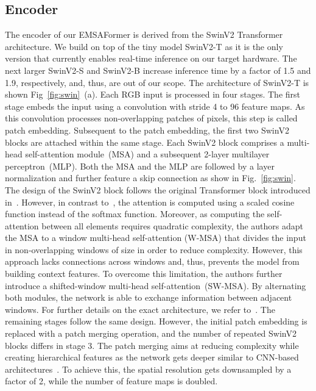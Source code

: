 \documentclass[conference]{IEEEtran}
\begin{document}
\subsection{Encoder}
\label{sec:main:encoder}
The encoder of our EMSAFormer is derived from the SwinV2 Transformer~\cite{swinv2-cvpr2022} architecture.
We build on top of the tiny model SwinV2-T as it is the only version that currently enables real-time inference on our target hardware. 
The next larger SwinV2-S and SwinV2-B increase inference time by a factor of 1.5 and 1.9, respectively, and, thus, are out of our scope.
The architecture of SwinV2-T is shown Fig~\ref{fig:swin}~(a).
Each RGB input is processed in four stages. 
The first stage embeds the input using a  convolution with stride 4 to 96 feature maps. 
As this convolution processes non-overlapping patches of  pixels, this step is called patch embedding.
Subsequent to the patch embedding, the first two SwinV2 blocks are attached within the same stage. 
Each SwinV2 block comprises a multi-head self-attention module~(MSA) and a subsequent 2-layer multilayer perceptron~(MLP). 
Both the MSA and the MLP are followed by a layer normalization and further feature a skip connection as show in Fig.~\ref{fig:swin}.
The design of the SwinV2 block follows the original Transformer block introduced in~\cite{Transformer-neurips2017}.
However, in contrast to~\cite{Transformer-neurips2017, swin-iccv2021, SegFromer-neurips2021}, the attention is computed using a scaled cosine function instead of the softmax function.
Moreover, as computing the self-attention between all elements requires quadratic complexity, the authors adapt the MSA to a window multi-head self-attention (W-MSA) that divides the input in non-overlapping windows of size  in order to reduce complexity.
However, this approach lacks connections across windows and, thus, prevents the model from building context features.
To overcome this limitation, the authors further introduce a shifted-window multi-head self-attention~(SW-MSA).
By alternating both modules, the network is able to exchange information between adjacent windows.
For further details on the exact architecture, we refer to~\cite{swin-iccv2021, swinv2-cvpr2022}.
The remaining stages follow the same design.
However, the initial patch embedding is replaced with a patch merging operation, and the number of repeated SwinV2 blocks differs in stage 3.
The patch merging aims at reducing complexity while creating hierarchical features as the network gets deeper similar to CNN-based architectures~\cite{ResNet-cvpr2016, EfficientNet-icml2019, convnext-cvpr2022}.
To achieve this, the spatial resolution gets downsampled by a factor of 2, while the number of feature maps is doubled.
\end{document}
